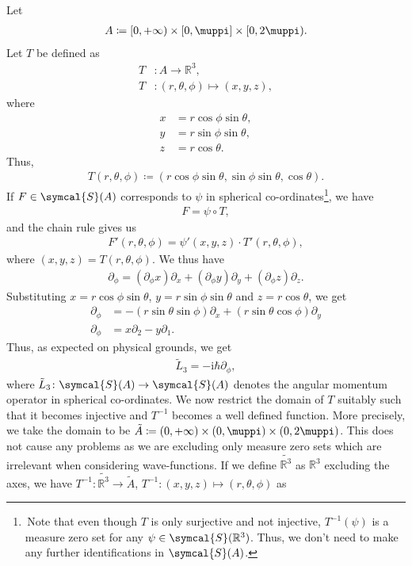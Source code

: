 \documentclass[12pt, a4 paper]{article}
\theoremstyle{definition}
\newcommand{\rthree}{\mathbb{R}^3}
\newcommand{\rr}{\mathbb{R}}
\newcommand{\schwartz}{\symcal{S}}
\newcommand{\schwartzrthree}{\schwartz(\rr^3)}
\renewcommand{\i}{\mathrm{i}}
\renewcommand{\pi}{\muppi}
\begin{document}
	Let
	\begin{align*}
	    A \coloneq [0, +\infty) \times [0,\pi] \times [0,2\pi).
	\end{align*}
	Let $T$ be defined as
	\begin{align*}
		T &\colon A \rightarrow \rthree,\\
		T &\colon (r, \theta, \phi) \mapsto (x, y, z),
	\end{align*}
	where
	\begin{align*}
		x &= r \cos{\phi} \sin{\theta},\\
		y &= r \sin{\phi} \sin{\theta},\\
		z &= r \cos{\theta}.
	\end{align*}
	Thus,
	\begin{align*}
	    T(r, \theta, \phi) \coloneq (r \cos{\phi} \sin{\theta}, \sin{\phi} \sin{\theta}, \cos{\theta}).
	\end{align*}
	If $F \in \schwartz(A)$ corresponds to $\psi$ in spherical co-ordinates\footnote{\,Note that even though $T$ is only surjective and not injective, $T^{-1}(\psi)$ is a measure zero set for any $\psi \in \schwartzrthree$. Thus, we don't need to make any further identifications in $\schwartz(A)$.}, we have
	\begin{align*}
		F = \psi \circ T,
	\end{align*}
	and the chain rule gives us
	\begin{align*}
	    F'(r, \theta, \phi) = \psi'(x,y,z) \cdot T'(r, \theta, \phi),
	\end{align*}
	where $(x,y,z) = T(r, \theta, \phi)$. We thus have
	\begin{align*}
	    \partial_\phi = (\partial_\phi x)\partial_x + (\partial_\phi y)\partial_y + (\partial_\phi z)\partial_z.
	\end{align*}
	Substituting $x = r \cos{\phi} \sin{\theta}$, $y = r \sin{\phi} \sin{\theta}$ and $z = r \cos{\theta}$, we get
	\begin{align*}
		\partial_\phi &= -(r \sin{\theta} \sin{\phi})\partial_x + (r \sin{\theta} \cos{\phi})\partial_y\\
		\partial_\phi &= x\partial_2 - y\partial_1.
	\end{align*}
	Thus, as expected on physical grounds, we get
	\begin{align*}
		\tilde{L}_3 = -\i\hbar\partial_\phi,
	\end{align*}
	where $\tilde{L}_3 \colon \schwartz(A) \rightarrow \schwartz(A)$ denotes the angular momentum operator in spherical co-ordinates.
	We now restrict the domain of $T$ suitably such that it becomes injective and $T^{-1}$ becomes a well defined function. More precisely, we take the domain to be $\tilde{A} \coloneq (0, +\infty) \times (0,\pi) \times (0,2\pi)$. This does not cause any problems as we are excluding only measure zero sets which are irrelevant when considering wave-functions. If we define $\tilde{\rthree}$ as $\rthree$ excluding the axes, we have $T^{-1} \colon \tilde{\rthree} \rightarrow \tilde{A}$, $T^{-1} \colon (x, y, z) \mapsto (r, \theta, \phi)$ as
\end{document}
